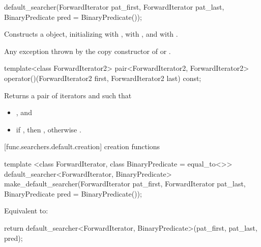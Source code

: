 %
\begin{itemdecl}
default_searcher(ForwardIterator pat_first, ForwardIterator pat_last,
                 BinaryPredicate pred = BinaryPredicate());
\end{itemdecl}

\begin{itemdescr}
\pnum
\effects
Constructs a  object, initializing 
with , \mbox{} with , and
 with .

\pnum
\throws
Any exception thrown by the copy constructor of  or
.
\end{itemdescr}

%
%
\begin{itemdecl}
template<class ForwardIterator2>
  pair<ForwardIterator2, ForwardIterator2>
    operator()(ForwardIterator2 first, ForwardIterator2 last) const;
\end{itemdecl}

\begin{itemdescr}
\pnum
\effects
Returns a pair of iterators  and  such that
\begin{itemize}
\item {}, and
\item if , then ,
otherwise .
\end{itemize}
\end{itemdescr}

[func.searchers.default.creation]{ creation functions}

%
\begin{itemdecl}
template <class ForwardIterator, class BinaryPredicate = equal_to<>>
  default_searcher<ForwardIterator, BinaryPredicate>
    make_default_searcher(ForwardIterator pat_first, ForwardIterator pat_last,
                          BinaryPredicate pred = BinaryPredicate());
\end{itemdecl}

\begin{itemdescr}
\pnum
\effects
Equivalent to:
\begin{codeblock}
return default_searcher<ForwardIterator, BinaryPredicate>(pat_first, pat_last, pred);
\end{codeblock}
\end{itemdescr}

